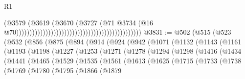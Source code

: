 \begin{lexlean}{R1}
\begin{coremodule}
                                                                                      (@3579
                                                                                        (@3619
                                                                                          (@3670
                                                                                            (@3727
                                                                                              (@71
                                                                                                @3734
                                                                                                (@16
                                                                                                  @70)))))))))))))))))))))))))))))))))))))))))))))))
@3831 := @502
    (@515
      (@523
        (@532
          (@856
            (@875
              (@894
                (@914
                  (@924
                    (@942
                      (@1071
                        (@1132
                          (@1143
                            (@1161
                              (@1193
                                (@1198
                                  (@1227
                                    (@1253
                                      (@1271
                                        (@1278
                                          (@1294
                                            (@1298
                                              (@1416
                                                (@1434
                                                  (@1441
                                                    (@1465
                                                      (@1529
                                                        (@1535
                                                          (@1561
                                                            (@1613
                                                              (@1625
                                                                (@1715
                                                                  (@1733
                                                                    (@1738
                                                                      (@1769
                                                                        (@1780
                                                                          (@1795
                                                                            (@1866
                                                                              (@1879

\end{coremodule}
\end{lexlean}
